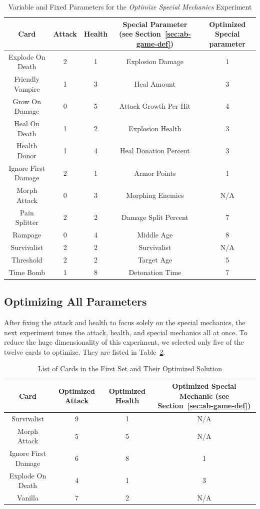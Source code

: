 \begin{table}[t]
\centering
\caption{Variable and Fixed Parameters for the \textit{Optimize Special Mechanics} Experiment}
\label{tab:special_cards}
\begin{tabular}{||c c c c c||} 
 \hline
 Card & Attack & Health & Special Parameter (see Section~\ref{sec:ab-game-def}) &  Optimized Special parameter\\ [0.5ex] 
 \hline\hline
 Explode On Death & 2 & 1 & Explosion Damage & 1\\ 
 \hline
 Friendly Vampire & 1 & 3 & Heal Amount & 3 \\
 \hline
 Grow On Damage & 0 & 5 & Attack Growth Per Hit & 4 \\
 \hline
 Heal On Death & 1 & 2 & Explosion Health & 3 \\
 \hline
 Health Donor & 1 & 4 & Heal Donation Percent & 3 \\
 \hline
 Ignore First Damage & 2 & 1 & Armor Points & 1 \\
 \hline
 Morph Attack & 0 & 3 & Morphing Enemies & N/A \\
 \hline
 Pain Splitter & 2 & 2 & Damage Split Percent & 7 \\
 \hline
 Rampage & 0 & 4 & Middle Age & 8 \\
 \hline
 Survivalist & 2 & 2 & Survivalist & N/A \\
 \hline
 Threshold & 2 & 2 & Target Age & 5 \\
 \hline
 Time Bomb & 1 & 8 & Detonation Time & 7 \\ 
 \hline
\end{tabular}
\end{table}

\subsection{Optimizing All Parameters} \label{sec:first_set}

After fixing the attack and health to focus solely on the special mechanics, the next experiment tunes the attack, health, and special mechanics all at once. To reduce the huge dimensionality of this experiment, we selected only five of the twelve cards to optimize. They are listed in Table~\ref{tab:first_set}.

\begin{table}[t]
\centering
\caption{List of Cards in the First Set and Their Optimized Solution}
\label{tab:first_set}
\begin{tabular}{||c c c c||} 
 \hline
 Card & Optimized Attack & Optimized Health & Optimized Special Mechanic (see Section~\ref{sec:ab-game-def})\\ [0.5ex]
 \hline\hline
 Survivalist & 9 & 1 & N/A \\
 \hline
 Morph Attack & 5 & 5 & N/A \\
 \hline
 Ignore First Damage & 6 & 8 & 1 \\
 \hline
 Explode On Death & 4 & 1 & 3 \\ 
 \hline
 Vanilla & 7 & 2 & N/A \\
 \hline
\end{tabular}
\end{table}

